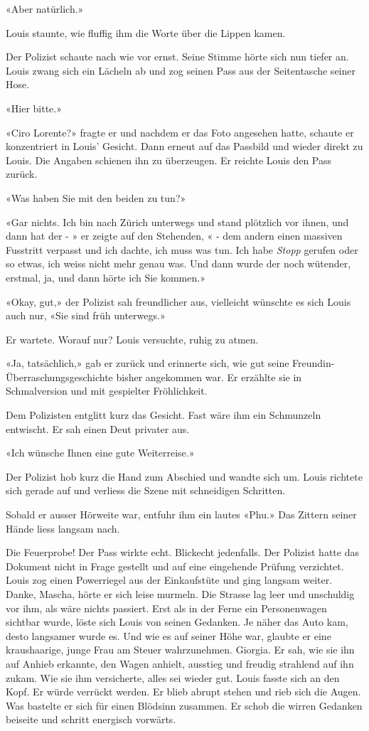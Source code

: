 «Aber natürlich.»

Louis staunte, wie fluffig ihm die Worte über die Lippen kamen.

Der Polizist schaute nach wie vor ernst. Seine Stimme hörte sich nun tiefer an. 
Louis zwang sich ein Lächeln ab und zog seinen Pass aus der Seitentasche
seiner Hose.

«Hier bitte.»

«Ciro Lorente?» fragte er und nachdem er das Foto angesehen hatte,
schaute er konzentriert in Louis’ Gesicht. Dann erneut auf das Passbild und wieder direkt zu Louis. Die Angaben schienen ihn zu überzeugen. Er reichte Louis den Pass zurück.

«Was haben Sie mit den beiden zu tun?»

«Gar nichts. Ich bin nach Zürich unterwegs und stand plötzlich vor
ihnen, und dann hat der - » er zeigte auf den Stehenden, « - dem andern einen
massiven Fusstritt verpasst und ich dachte, ich muss was tun. Ich habe
\emph{Stopp} gerufen oder so etwas, ich weiss nicht mehr genau was. Und
dann wurde der noch wütender, erstmal, ja, und dann hörte ich Sie
kommen.»

«Okay, gut,» der Polizist sah freundlicher aus, vielleicht wünschte es
sich Louis auch nur, «Sie sind früh unterwegs.»

Er wartete. Worauf nur? Louis versuchte, ruhig zu atmen.

«Ja, tatsächlich,» gab er zurück und erinnerte sich, wie gut seine
Freundin-Überraschungsgeschichte bisher angekommen war. Er erzählte
sie in Schmalversion und mit gespielter Fröhlichkeit.

Dem Polizisten entglitt kurz das Gesicht. Fast wäre ihm ein Schmunzeln
entwischt. Er sah einen Deut privater aus.

«Ich wünsche Ihnen eine gute Weiterreise.»

Der Polizist hob kurz die Hand zum Abschied und wandte sich um. Louis
richtete sich gerade auf und verliess die Szene mit schneidigen Schritten.

Sobald er ausser Hörweite war, entfuhr ihm ein lautes «Phu.»
Das Zittern seiner Hände liess langsam nach.

Die Feuerprobe! Der Pass wirkte echt. Blickecht jedenfalls. Der Polizist hatte das Dokument nicht in Frage gestellt und auf eine eingehende Prüfung verzichtet. Louis zog einen Powerriegel aus der Einkaufstüte und ging langsam weiter. Danke, Mascha, hörte er sich leise murmeln. 
Die Strasse lag leer und unschuldig vor ihm, als wäre nichts passiert. 
Erst als in der Ferne ein Personenwagen sichtbar wurde, löste sich Louis von seinen Gedanken. Je näher das Auto kam, desto langsamer wurde es. Und wie es auf seiner Höhe war, glaubte er eine kraushaarige, junge Frau am Steuer wahrzunehmen. Giorgia. Er sah, wie sie ihn auf Anhieb erkannte, den Wagen anhielt, ausstieg und freudig strahlend auf ihn zukam. Wie sie ihm versicherte, alles sei wieder gut. Louis fasste sich an den Kopf. Er würde verrückt werden. Er blieb abrupt stehen und rieb sich die Augen. Was bastelte er sich für einen Blödsinn zusammen. Er schob die wirren Gedanken beiseite und schritt energisch vorwärts.

